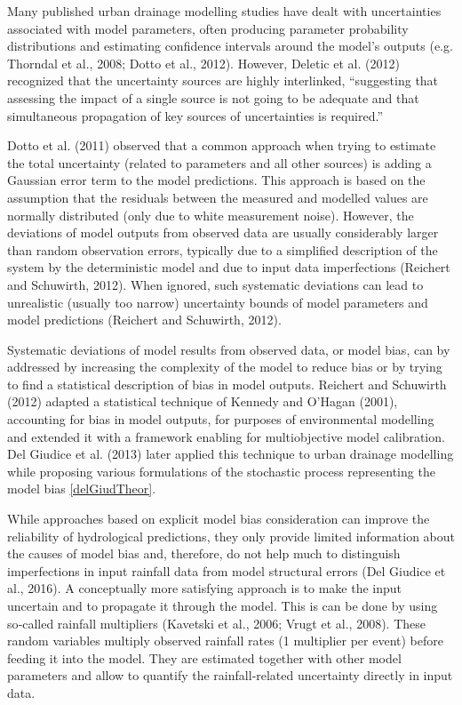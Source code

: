 \documentclass{ctuthesis}\usepackage[]{graphicx}\usepackage[]{color}
\begin{document}
Many published urban drainage modelling studies have dealt with uncertainties associated with model parameters, often producing parameter probability distributions and estimating confidence intervals around the model’s outputs (e.g. Thorndal et al., 2008; Dotto et al., 2012). However, Deletic et al. (2012) recognized that the uncertainty sources are highly interlinked, “suggesting that assessing the impact of a single source is not going to be adequate and that simultaneous propagation of key sources of uncertainties is required.”

Dotto et al. (2011) observed that a common approach when trying to estimate the total uncertainty
(related to parameters and all other sources) is adding a Gaussian error term to the model
predictions. This approach is based on the assumption that the residuals between the measured and
modelled values are normally distributed (only due to white measurement noise). However, the
deviations of model outputs from observed data are usually considerably larger than random
observation errors, typically due to a simplified description of the system by the deterministic model
and due to input data imperfections (Reichert and Schuwirth, 2012). When ignored, such systematic
deviations can lead to unrealistic (usually too narrow) uncertainty bounds of model parameters and
model predictions (Reichert and Schuwirth, 2012).

Systematic deviations of model results from observed data, or model bias, can by addressed by
increasing the complexity of the model to reduce bias or by trying to find a statistical description of
bias in model outputs. Reichert and Schuwirth (2012) adapted a statistical technique of Kennedy and
O’Hagan (2001), accounting for bias in model outputs, for purposes of environmental modelling and
extended it with a framework enabling for multiobjective model calibration. Del Giudice et al. (2013)
later applied this technique to urban drainage modelling while proposing various formulations of the
stochastic process representing the model bias {\ref{delGiudTheor}}.

While approaches based on explicit model bias consideration can improve the reliability of
hydrological predictions, they only provide limited information about the causes of model bias and,
therefore, do not help much to distinguish imperfections in input rainfall data from model structural
errors (Del Giudice et al., 2016). A conceptually more satisfying approach is to make the input
uncertain and to propagate it through the model. This is can be done by using so‐called rainfall
multipliers (Kavetski et al., 2006; Vrugt et al., 2008). These random variables multiply observed
rainfall rates (1 multiplier per event) before feeding it into the model. They are estimated together
with other model parameters and allow to quantify the rainfall‐related uncertainty directly in input
data.
\end{document}

